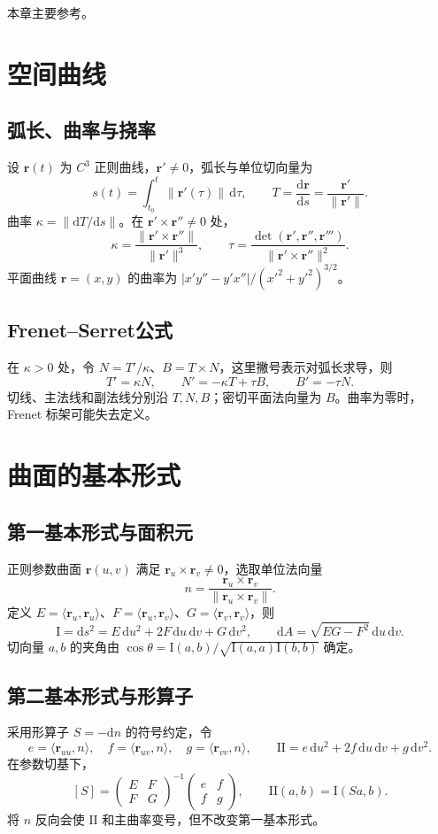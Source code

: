\documentclass[../main.tex]{subfiles}
\begin{document}
本章主要参考\cite{riemann}。

\section{空间曲线}
\subsection{弧长、曲率与挠率}
设 $\bm r(t)$ 为 $C^3$ 正则曲线，$\bm r'\ne0$，弧长与单位切向量为
\[
s(t)=\int_{t_0}^t\|\bm r'(\tau)\|\,\mathrm d\tau,\qquad
T=\frac{\mathrm d\bm r}{\mathrm ds}=\frac{\bm r'}{\|\bm r'\|}.
\]
曲率 $\kappa=\|\mathrm dT/\mathrm ds\|$。在 $\bm r'\times\bm r''\ne0$ 处，
\[
\kappa=\frac{\|\bm r'\times\bm r''\|}{\|\bm r'\|^3},\qquad
\tau=\frac{\det(\bm r',\bm r'',\bm r''')}{\|\bm r'\times\bm r''\|^2}.
\]
平面曲线 $\bm r=(x,y)$ 的曲率为 $|x'y''-y'x''|/(x'^2+y'^2)^{3/2}$。
\subsection{Frenet--Serret公式}
在 $\kappa>0$ 处，令 $N=T'/\kappa$、$B=T\times N$，这里撇号表示对弧长求导，则
\[
T'=\kappa N,\qquad N'=-\kappa T+\tau B,\qquad B'=-\tau N.
\]
切线、主法线和副法线分别沿 $T,N,B$；密切平面法向量为 $B$。曲率为零时，Frenet 标架可能失去定义。
\section{曲面的基本形式}
\subsection{第一基本形式与面积元}
正则参数曲面 $\bm r(u,v)$ 满足 $\bm r_u\times\bm r_v\ne0$，选取单位法向量
\[
n=\frac{\bm r_u\times\bm r_v}{\|\bm r_u\times\bm r_v\|}.
\]
定义 $E=\langle\bm r_u,\bm r_u\rangle$、$F=\langle\bm r_u,\bm r_v\rangle$、$G=\langle\bm r_v,\bm r_v\rangle$，则
\[
\mathrm I=\mathrm ds^2=E\,\mathrm du^2+2F\,\mathrm du\,\mathrm dv+G\,\mathrm dv^2,
\qquad\mathrm dA=\sqrt{EG-F^2}\,\mathrm du\,\mathrm dv.
\]
切向量 $a,b$ 的夹角由 $\cos\theta=\mathrm I(a,b)/\sqrt{\mathrm I(a,a)\mathrm I(b,b)}$ 确定。
\subsection{第二基本形式与形算子}
采用形算子 $S=-\mathrm dn$ 的符号约定，令
\[
e=\langle\bm r_{uu},n\rangle,\quad f=\langle\bm r_{uv},n\rangle,\quad
 g=\langle\bm r_{vv},n\rangle,\qquad
\mathrm{II}=e\,\mathrm du^2+2f\,\mathrm du\,\mathrm dv+g\,\mathrm dv^2.
\]
在参数切基下，
\[
[S]=\begin{pmatrix}E&F\\F&G\end{pmatrix}^{-1}
\begin{pmatrix}e&f\\f&g\end{pmatrix},\qquad
\mathrm{II}(a,b)=\mathrm I(Sa,b).
\]
将 $n$ 反向会使 $\mathrm{II}$ 和主曲率变号，但不改变第一基本形式。
\end{document}
